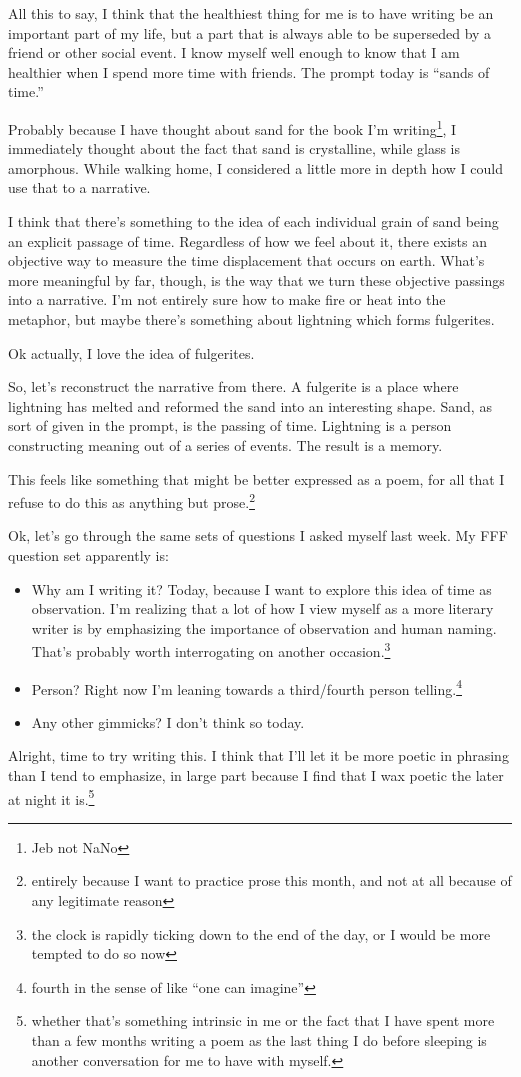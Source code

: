 \documentclass[12pt]{article}[titlepage]
\newcommand{\say}[1]{``#1''}
\newcommand{\1}{\={a}}
\newcommand{\2}{\={e}}
\newcommand{\3}{\={\i}}
\newcommand{\4}{\=o}
\newcommand{\5}{\=u}
\newcommand{\6}{\={A}}
\renewcommand{\,}{\textsuperscript{,}}
\begin{document}
{All this to say, I think that the healthiest thing for me is to have writing be an important part of my life, but a part that is always able to be superseded by a friend or other social event.
I know myself well enough to know that I am healthier when I spend more time with friends.}
The prompt today is \say{sands of time.}

Probably because I have thought about sand for the book I'm writing\footnote{Jeb not NaNo}, I immediately thought about the fact that sand is crystalline, while glass is amorphous.
While walking home, I considered a little more in depth how I could use that to a narrative.

I think that there's something to the idea of each individual grain of sand being an explicit passage of time.
Regardless of how we feel about it, there exists an objective way to measure the time displacement that occurs on earth.
What's more meaningful by far, though, is the way that we turn these objective passings into a narrative.
I'm not entirely sure how to make fire or heat into the metaphor, but maybe there's something about lightning which forms fulgerites.

Ok actually, I love the idea of fulgerites.

So, let's reconstruct the narrative from there.
A fulgerite is a place where lightning has melted and reformed the sand into an interesting shape.
Sand, as sort of given in the prompt, is the passing of time.
Lightning is a person constructing meaning out of a series of events.
The result is a memory.

This feels like something that might be better expressed as a poem, for all that I refuse to do this as anything but prose.\footnote{entirely because I want to practice prose this month, and not at all because of any legitimate reason}

Ok, let's go through the same sets of questions I asked myself last week.
My FFF question set apparently is:
\begin{itemize}
\item Why am I writing it? Today, because I want to explore this idea of time as observation.
I'm realizing that a lot of how I view myself as a more literary writer is by emphasizing the importance of observation and human naming.
That's probably worth interrogating on another occasion.\footnote{the clock is rapidly ticking down to the end of the day, or I would be more tempted to do so now}
\item Person? Right now I'm leaning towards a third/fourth person telling.\footnote{fourth in the sense of like \say{one can imagine}}
\item Any other gimmicks?
I don't think so today.
\end{itemize}
Alright, time to try writing this.
I think that I'll let it be more poetic in phrasing than I tend to emphasize, in large part because I find that I wax poetic the later at night it is.\footnote{whether that's something intrinsic in me or the fact that I have spent more than a few months writing a poem as the last thing I do before sleeping is another conversation for me to have with myself.}
\end{document}
